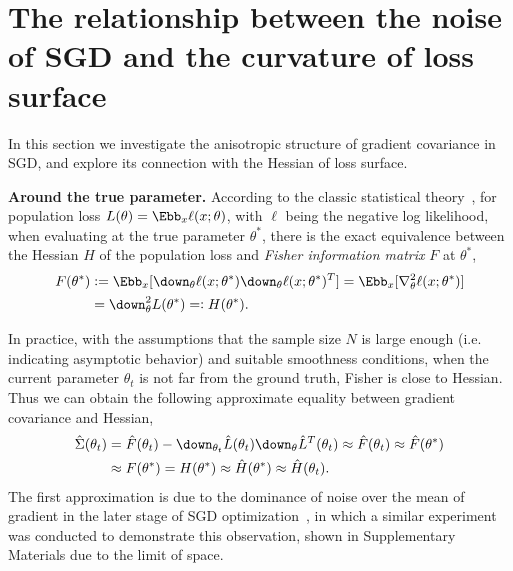 \documentclass{article}
\begin{document}
\section{The relationship between the noise of SGD and the curvature of loss surface}
\label{sec:sgdnoise}

In this section we investigate the anisotropic structure of gradient covariance in SGD, and explore its connection with the Hessian of loss surface.

\textbf{Around the true parameter.} 
According to the classic statistical theory~\citep[Chap. 8]{pawitan2001all}, for population loss $L(\theta) = \Ebb_x \ell(x; \theta)$, with $\ell$ being the negative log likelihood, when evaluating at the true parameter $\theta^*$,
there is the exact equivalence between the Hessian $H$ of the population loss and \emph{ Fisher information matrix} $F$ at $\theta^*$,
\begin{equation*}
\begin{aligned}
    F(\theta^*) &:= \Ebb_x [\down_{\theta} \ell(x; \theta^*) \down_{\theta} \ell(x; \theta^*)^T] = \Ebb_x [\nabla_{\theta}^2 \ell(x; \theta^*)]\\
    &= \down^2_{\theta} L(\theta^*) =: H(\theta^*).
\end{aligned}
\end{equation*}


In practice, with the assumptions that the sample size $N$ is large enough (i.e. indicating asymptotic behavior) and suitable smoothness conditions, when the current parameter $\theta_t$ is not far from the ground truth, Fisher is close to Hessian. Thus we can obtain the following approximate equality between gradient covariance and Hessian,
\begin{equation}
    \begin{aligned}
            \hat{\Sigma} (\theta_t) &= \hat{F} (\theta_t) - \down_{\theta_t} \hat{L}(\theta_t)\down_{\theta}\hat{L}^T(\theta_t) \approx \hat{F} (\theta_t) \approx \hat{F} (\theta^*) \\ &\approx F(\theta^*) = H(\theta^*)  \approx \hat{H} (\theta^*) \approx \hat{H}(\theta_t).
    \end{aligned}
\end{equation}
The first approximation is due to the dominance of noise over the mean of gradient in the later stage of SGD optimization~\citep{shwartz2017opening}, in which 
a similar experiment was conducted to demonstrate this observation, shown in Supplementary Materials due to the limit of space.
\end{document}
